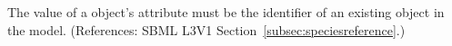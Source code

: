 The value of a \SpeciesReference object's  attribute must be
the identifier of an existing \Species object in the model.  (References:
SBML L3V1 Section~\ref{subsec:speciesreference}.)
